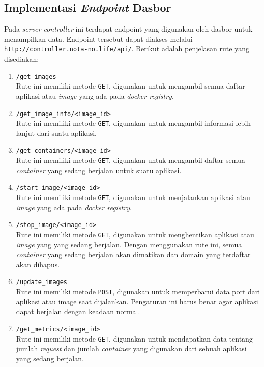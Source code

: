         \subsection{Implementasi \textit{Endpoint} Dasbor}
        	Pada \textit{server controller} ini terdapat endpoint yang digunakan oleh dasbor untuk menampilkan data. Endpoint tersebut dapat diakses melalui \texttt{http://controller.nota-no.life/api/}. Berikut adalah penjelasan rute yang disediakan:
        \begin{enumerate}
        \item \texttt{/get\_images} \\
        	Rute ini memiliki metode \texttt{GET}, digunakan untuk mengambil semua daftar aplikasi atau \textit{image} yang ada pada \textit{docker registry}.
        \item \texttt{/get\_image\_info/<image\_id>} \\
        	Rute ini memiliki metode \texttt{GET}, digunakan untuk mengambil informasi lebih lanjut dari suatu aplikasi. 
        \item \texttt{/get\_containers/<image\_id>} \\
        	Rute ini memiliki metode \texttt{GET}, digunakan untuk mengambil daftar semua \textit{container} yang sedang berjalan untuk suatu aplikasi.
        \item \texttt{/start\_image/<image\_id>} \\
        	Rute ini memiliki metode \texttt{GET}, digunakan untuk menjalankan aplikasi atau \textit{image} yang ada pada \textit{docker registry}.
        \item \texttt{/stop\_image/<image\_id>} \\
        	Rute ini memiliki metode \texttt{GET}, digunakan untuk menghentikan aplikasi atau \textit{image} yang yang sedang berjalan. Dengan menggunakan rute ini, semua \textit{container} yang sedang berjalan akan dimatikan dan domain yang terdaftar akan dihapus.
        \item \texttt{/update\_images} \\
        	Rute ini memiliki metode \texttt{POST}, digunakan untuk memperbarui data port dari aplikasi atau image saat dijalankan. Pengaturan ini harus benar agar aplikasi dapat berjalan dengan keadaan normal.
        \item \texttt{/get\_metrics/<image\_id>} \\
        	Rute ini memiliki metode \texttt{GET}, digunakan untuk mendapatkan data tentang jumlah \textit{request} dan jumlah \textit{container} yang digunakan dari sebuah aplikasi yang sedang berjalan.
        \end{enumerate}
        
